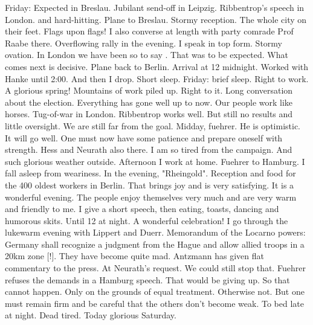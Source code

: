 Friday: Expected in Breslau. Jubilant send-off in Leipzig. Ribbentrop's speech in London.  and hard-hitting. Plane to Breslau. Stormy reception. The whole city on their feet. Flags upon flags! I also converse at length with party comrade Prof Raabe there. Overflowing rally in the evening. I speak in top form. Stormy ovation. In London we have been so to say . That was to be expected. What comes next is decisive. Plane back to Berlin. Arrival at 12 midnight. Worked with Hanke until 2:00. And then I drop. Short sleep.
Friday: brief sleep. Right to work. A glorious spring!  Mountains of work piled up. Right to it. Long conversation about the election. Everything has gone well up to now. Our people work like horses. Tug-of-war in London. Ribbentrop works well. But still no results and little oversight. We are still far from the goal. Midday, fuehrer. He is optimistic. It will go well. One must now have some patience and prepare oneself with strength. Hess and Neurath also there. I am so tired from the campaign. And such glorious weather outside. Afternoon I work at home. Fuehrer to Hamburg. I fall asleep from weariness. In the evening, "Rheingold". Reception and food for the 400 oldest workers in Berlin. That brings joy and is very satisfying. It is a wonderful evening. The people enjoy themselves very much and are very warm and friendly to me. I give a short speech, then eating, toasts, dancing and humorous skits. Until 12 at night. A wonderful celebration! I go through the lukewarm evening with Lippert and Duerr. Memorandum of the Locarno powers: Germany shall recognize a judgment from the Hague and allow allied troops in a 20km zone [!]. They have become quite mad. Antzmann has given flat commentary to the press. At Neurath's request. We could still stop that. Fuehrer refuses the demands in a Hamburg speech. That would be giving up. So that cannot happen. Only on the grounds of equal treatment. Otherwise not.  But one must remain firm and be careful that the others don't become weak. To bed late at night. Dead tired. Today glorious Saturday. 

